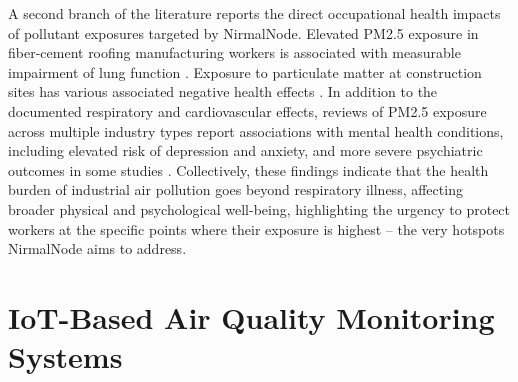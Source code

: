A second branch of the literature reports the direct occupational health impacts of pollutant exposures targeted by NirmalNode. Elevated PM2.5 exposure in fiber-cement roofing manufacturing workers is associated with measurable impairment of lung function \citep{nasri2023pm25}. Exposure to particulate matter at construction sites has various associated negative health effects \citep{sekhavati2023particulate}. In addition to the documented respiratory and cardiovascular effects, reviews of PM2.5 exposure across multiple industry types report associations with mental health conditions, including elevated risk of depression and anxiety, and more severe psychiatric outcomes in some studies \citep{alhadhrami2024pm25mental}. Collectively, these findings indicate that the health burden of industrial air pollution goes beyond respiratory illness, affecting broader physical and psychological well-being, highlighting the urgency to protect workers at the specific points where their exposure is highest -- the very hotspots NirmalNode aims to address.

\section{IoT-Based Air Quality Monitoring Systems}
\label{sec:lr-iot-monitoring}

